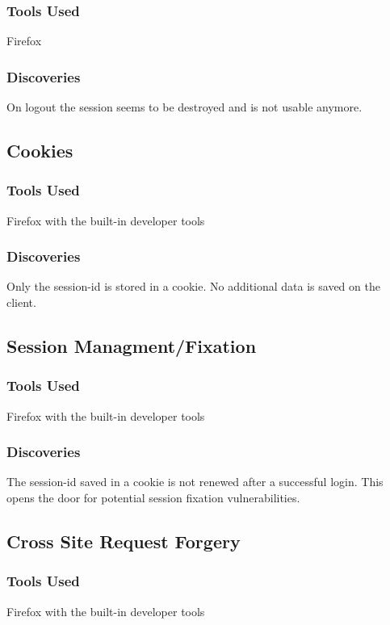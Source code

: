 \documentclass{article}
\begin{document}
\subsubsection{Tools Used}
Firefox

\subsubsection{Discoveries}
On logout the session seems to be destroyed and is not usable anymore.

\subsection{Cookies}
\subsubsection{Tools Used}
Firefox with the built-in developer tools

\subsubsection{Discoveries}
Only the session-id is stored in a cookie. No additional data is saved on the client.

\subsection{Session Managment/Fixation}
\subsubsection{Tools Used}
Firefox with the built-in developer tools

\subsubsection{Discoveries}
The session-id saved in a cookie is not renewed after a successful login. This opens the door for potential session fixation vulnerabilities.

\subsection{Cross Site Request Forgery}
\subsubsection{Tools Used}
Firefox with the built-in developer tools
\end{document}
